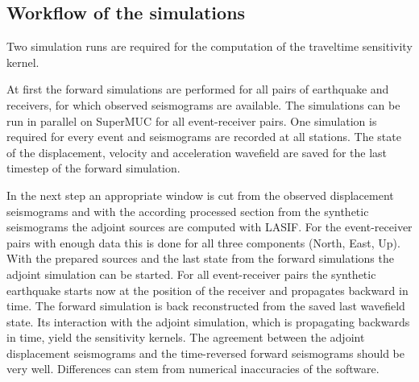 \subsection{Workflow of the simulations}

Two simulation runs are required for the computation of the traveltime sensitivity kernel.

At first the forward simulations are performed for all pairs of earthquake and receivers, for which observed seismograms are available.
The simulations can be run in parallel on SuperMUC for all event-receiver pairs. 
One simulation is required for every event and seismograms are recorded at all stations. %
The state of the displacement, velocity and acceleration wavefield are saved for the last timestep of the forward simulation.

In the next step an appropriate window %
is cut from the observed displacement seismograms and with the according processed section from the synthetic seismograms 
the adjoint sources are computed with LASIF.
For the event-receiver pairs with enough data this is done for all three components (North, East, Up).
With the prepared sources and the last state from the forward simulations the adjoint simulation can be started.
For all event-receiver pairs the synthetic earthquake starts now at the position of the receiver and propagates
backward in time.  
The forward simulation is back reconstructed from the saved last wavefield state. 
Its interaction with the adjoint simulation, which is propagating backwards in time,
yield the sensitivity kernels. %
The agreement between the adjoint displacement seismograms and the time-reversed forward seismograms should be very well.
Differences can stem from numerical inaccuracies of the software. %










